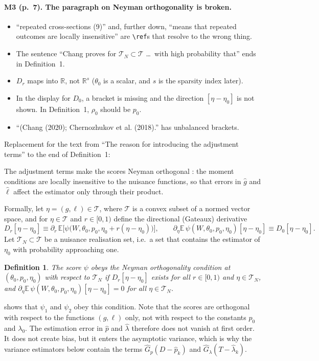 \documentclass[11pt]{article}
\providecommand{\E}{\mathbb{E}}
\newcommand{\wrong}[1]{\textcolor{red!70!black}{#1}}
\newenvironment{ins}{\begin{leftbar}}{\end{leftbar}}
\theoremstyle{plain}
\newtheorem{definition}[lemma]{Definition}
\theoremstyle{remark}
\begin{document}
\paragraph{M3 (p.~7). The paragraph on Neyman orthogonality is broken.}
\begin{itemize}
\item ``repeated cross-sections (9)'' and, further down, ``means that
  \wrong{repeated outcomes} are locally insensitive'' are \verb|\ref|s that
  resolve to the wrong thing.
\item The sentence ``Chang proves for $\mathcal T_N\subset\mathcal T$ \dots\ with
  high probability that'' ends in Definition~1.
\item $D_r$ maps into $\mathbb R$, not $\mathbb R^s$ ($\theta_0$ is a scalar, and
  $s$ is the sparsity index later).
\item In the display for $D_0$, a bracket is missing and the direction
  $[\eta-\eta_0]$ is not shown. In Definition~1, $\rho_0$ should be $p_0$.
\item ``(Chang (2020); Chernozhukov et al. (2018).'' has unbalanced brackets.
\end{itemize}
Replacement for the text from ``The reason for introducing the adjustment
terms'' to the end of Definition~1:
\begin{ins}
The adjustment terms make the scores Neyman orthogonal
\parencite{chang2020double,chernozhukov2018double}: the moment conditions are
locally insensitive to the nuisance functions, so that errors in $\hat g$ and
$\hat\ell$ affect the estimator only through their product.

Formally, let $\eta=(g,\ell)\in\mathcal T$, where $\mathcal T$ is a convex subset
of a normed vector space, and for $\eta\in\mathcal T$ and $r\in[0,1)$ define the
directional (Gateaux) derivative
\[
  D_r[\eta-\eta_0]\equiv\partial_r\,\E\big[\psi\big(W,\theta_0,p_0,\eta_0+r(\eta-\eta_0)\big)\big],
  \qquad
  \partial_\eta\E\,\psi(W,\theta_0,p_0,\eta_0)[\eta-\eta_0]\equiv D_0[\eta-\eta_0].
\]
Let $\mathcal T_N\subset\mathcal T$ be a nuisance realisation set, i.e.\ a set
that contains the estimator of $\eta_0$ with probability approaching one.

\begin{definition}
The score $\psi$ obeys the Neyman orthogonality condition at
$(\theta_0,p_0,\eta_0)$ with respect to $\mathcal T_N$ if $D_r[\eta-\eta_0]$
exists for all $r\in[0,1)$ and $\eta\in\mathcal T_N$, and
$\partial_\eta\E\,\psi(W,\theta_0,p_0,\eta_0)[\eta-\eta_0]=0$ for all
$\eta\in\mathcal T_N$.
\end{definition}

\textcite[Lemma~3.1]{chang2020double} shows that $\psi_1$ and $\psi_2$ obey this
condition. Note that the scores are orthogonal with respect to the functions
$(g,\ell)$ only, not with respect to the constants $p_0$ and $\lambda_0$. The
estimation error in $\hat p$ and $\hat\lambda$ therefore does not vanish at first
order. It does not create bias, but it enters the asymptotic variance, which is
why the variance estimators below contain the terms $\hat G_p(D-\hat p_k)$ and
$\hat G_\lambda(T-\hat\lambda_k)$.
\end{ins}
\end{document}
